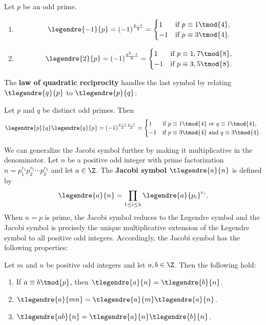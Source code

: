     \begin{proposition}
      Let $p$ be an odd prime.
      \begin{enumerate}[label=(\roman*)]
        \item
        \[
          \legendre{-1}{p} = (-1)^{\frac{p-1}{2}} = \begin{cases} 1 & \text{if $p \equiv 1 \tmod{4}$}, \\ -1 & \text{if $p \equiv 3 \tmod{4}$}. \end{cases}
        \]
        \item
        \[
          \legendre{2}{p} = (-1)^{\frac{p^{2}-1}{8}} = \begin{cases} 1 & \text{if $p \equiv 1,7 \tmod{8}$}, \\ -1 & \text{if $p \equiv 3,5 \tmod{8}$}. \end{cases}
        \]
      \end{enumerate}
    \end{proposition}
    The \textbf{law of quadratic reciprocity} handles the last symbol by relating $\tlegendre{q}{p}$ to $\tlegendre{p}{q}$:
    \begin{theorem}
      Let $p$ and $q$ be distinct odd primes. Then
      \[
        \legendre{p}{q}\legendre{q}{p} = (-1)^{\frac{p-1}{2}\frac{q-1}{2}} = \begin{cases} 1 & \text{if $p \equiv 1 \tmod{4}$ or $q \equiv 1 \tmod{4}$}, \\ -1 & \text{if $p \equiv 3 \tmod{4}$ and $q \equiv 3 \tmod{4}$}. \end{cases}
      \]
    \end{theorem}
    We can generalize the Jacobi symbol further by making it multiplicative in the denominator. Let $n$ be a positive odd integer with prime factorization $n = p_{1}^{r_{1}}p_{2}^{r_{2}} \cdots p_{k}^{r_{k}}$ and let $a \in \Z$. The \textbf{Jacobi symbol} $\tlegendre{a}{n}$ is defined by
    \[
      \legendre{a}{n} = \prod_{1 \le i \le k}\legendre{a}{p_{i}}^{r_{i}}.
    \]
    When $n = p$ is prime, the Jacobi symbol reduces to the Legendre symbol and the Jacobi symbol is precisely the unique multiplicative extension of the Legendre symbol to all positive odd integers. Accordingly, the Jacobi symbol has the following properties:
    \begin{proposition}
      Let $m$ and $n$ be positive odd integers and let $a,b \in \Z$. Then the following hold:
      \begin{enumerate}[label=(\roman*)]
        \item If $a \equiv b \tmod{p}$, then $\tlegendre{a}{n} = \tlegendre{b}{n}$.
        \item $\tlegendre{a}{mn} = \tlegendre{a}{m}\tlegendre{a}{n}$.
        \item $\tlegendre{ab}{n} = \tlegendre{a}{n}\tlegendre{b}{n}$.
      \end{enumerate}
    \end{proposition}
